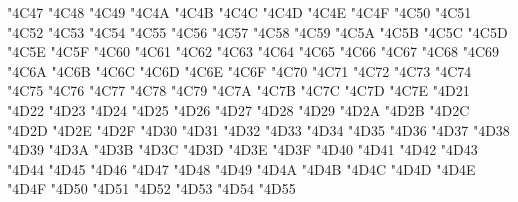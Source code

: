 {\Uchar\jis"4C47 %
\Uchar\jis"4C48 %
\Uchar\jis"4C49 %
\Uchar\jis"4C4A %
\Uchar\jis"4C4B %
\Uchar\jis"4C4C %
\Uchar\jis"4C4D %
\Uchar\jis"4C4E %
\Uchar\jis"4C4F %
\Uchar\jis"4C50 %
\Uchar\jis"4C51 %
\Uchar\jis"4C52 %
\Uchar\jis"4C53 %
\Uchar\jis"4C54 %
\Uchar\jis"4C55 %
\Uchar\jis"4C56 %
\Uchar\jis"4C57 %
\Uchar\jis"4C58 %
\Uchar\jis"4C59 %
\Uchar\jis"4C5A %
\Uchar\jis"4C5B %
\Uchar\jis"4C5C %
\Uchar\jis"4C5D %
\Uchar\jis"4C5E %
\Uchar\jis"4C5F %
\Uchar\jis"4C60 %
\Uchar\jis"4C61 %
\Uchar\jis"4C62 %
\Uchar\jis"4C63 %
\Uchar\jis"4C64 %
\Uchar\jis"4C65 %
\Uchar\jis"4C66 %
\Uchar\jis"4C67 %
\Uchar\jis"4C68 %
\Uchar\jis"4C69 %
\Uchar\jis"4C6A %
\Uchar\jis"4C6B %
\Uchar\jis"4C6C %
\Uchar\jis"4C6D %
\Uchar\jis"4C6E %
\Uchar\jis"4C6F %
\Uchar\jis"4C70 %
\Uchar\jis"4C71 %
\Uchar\jis"4C72 %
\Uchar\jis"4C73 %
\Uchar\jis"4C74 %
\Uchar\jis"4C75 %
\Uchar\jis"4C76 %
\Uchar\jis"4C77 %
\Uchar\jis"4C78 %
\Uchar\jis"4C79 %
\Uchar\jis"4C7A %
\Uchar\jis"4C7B %
\Uchar\jis"4C7C %
\Uchar\jis"4C7D %
\Uchar\jis"4C7E %
\Uchar\jis"4D21 %
\Uchar\jis"4D22 %
\Uchar\jis"4D23 %
\Uchar\jis"4D24 %
\Uchar\jis"4D25 %
\Uchar\jis"4D26 %
\Uchar\jis"4D27 %
\Uchar\jis"4D28 %
\Uchar\jis"4D29 %
\Uchar\jis"4D2A %
\Uchar\jis"4D2B %
\Uchar\jis"4D2C %
\Uchar\jis"4D2D %
\Uchar\jis"4D2E %
\Uchar\jis"4D2F %
\Uchar\jis"4D30 %
\Uchar\jis"4D31 %
\Uchar\jis"4D32 %
\Uchar\jis"4D33 %
\Uchar\jis"4D34 %
\Uchar\jis"4D35 %
\Uchar\jis"4D36 %
\Uchar\jis"4D37 %
\Uchar\jis"4D38 %
\Uchar\jis"4D39 %
\Uchar\jis"4D3A %
\Uchar\jis"4D3B %
\Uchar\jis"4D3C %
\Uchar\jis"4D3D %
\Uchar\jis"4D3E %
\Uchar\jis"4D3F %
\Uchar\jis"4D40 %
\Uchar\jis"4D41 %
\Uchar\jis"4D42 %
\Uchar\jis"4D43 %
\Uchar\jis"4D44 %
\Uchar\jis"4D45 %
\Uchar\jis"4D46 %
\Uchar\jis"4D47 %
\Uchar\jis"4D48 %
\Uchar\jis"4D49 %
\Uchar\jis"4D4A %
\Uchar\jis"4D4B %
\Uchar\jis"4D4C %
\Uchar\jis"4D4D %
\Uchar\jis"4D4E %
\Uchar\jis"4D4F %
\Uchar\jis"4D50 %
\Uchar\jis"4D51 %
\Uchar\jis"4D52 %
\Uchar\jis"4D53 %
\Uchar\jis"4D54 %
\Uchar\jis"4D55 %
}

